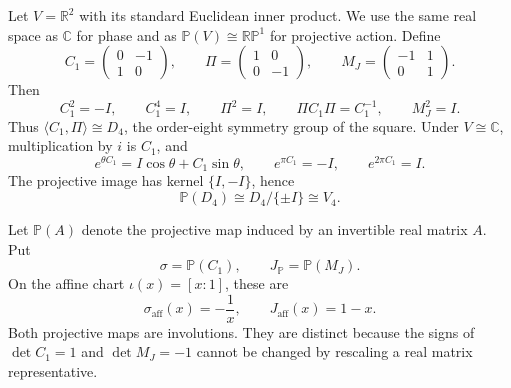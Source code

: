 \documentclass[10pt,oneside]{article}
\theoremstyle{plaincompact}
\theoremstyle{definitioncompact}
\newcommand{\R}{\mathbb R}
\newcommand{\C}{\mathbb C}
\newcommand{\RP}{\mathbb {RP}}
\begin{document}
Let $V=\R^2$ with its standard Euclidean inner product.  We use the same real
space as $\C$ for phase and as $\mathbb P(V)\cong\RP^1$ for projective action.
Define
\begin{equation}\label{eq:generators}
C_1=\begin{pmatrix}0&-1\\1&0\end{pmatrix},\qquad
\Pi=\begin{pmatrix}1&0\\0&-1\end{pmatrix},\qquad
M_J=\begin{pmatrix}-1&1\\0&1\end{pmatrix}.
\end{equation}
Then
\begin{equation}\label{eq:d4relations}
C_1^2=-I,\qquad C_1^4=I,\qquad
\Pi^2=I,\qquad \Pi C_1\Pi=C_1^{-1},\qquad M_J^2=I.
\end{equation}
Thus $\langle C_1,\Pi\rangle\cong D_4$, the order-eight symmetry group of the
square.  Under $V\cong\C$, multiplication by $i$ is $C_1$, and
\begin{equation}\label{eq:exp}
e^{\theta C_1}=I\cos\theta+C_1\sin\theta,
\qquad e^{\pi C_1}=-I,\qquad e^{2\pi C_1}=I.
\end{equation}
The projective image has kernel $\{I,-I\}$, hence
\begin{equation}\label{eq:projectived4}
\mathbb P(D_4)\cong D_4/\{\pm I\}\cong V_4.
\end{equation}

Let $\mathbb P(A)$ denote the projective map induced by an invertible real
matrix $A$.  Put
\begin{equation}\label{eq:projmaps}
\sigma=\mathbb P(C_1),\qquad J_{\mathbb P}=\mathbb P(M_J).
\end{equation}
On the affine chart $\iota(x)=[x:1]$, these are
\begin{equation}\label{eq:affineinvolutions}
\sigma_{\mathrm{aff}}(x)=-\frac1x,\qquad
J_{\mathrm{aff}}(x)=1-x.
\end{equation}
Both projective maps are involutions.  They are distinct because the signs of
$\det C_1=1$ and $\det M_J=-1$ cannot be changed by rescaling a real matrix
representative.
\end{document}
